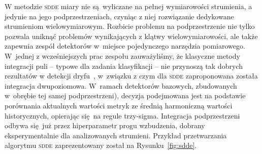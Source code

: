 W metodzie \textsc{sdde} miary nie są wyliczane na pełnej wymiarowości strumienia, a jedynie na jego podprzestrzeniach, czyniąc z niej rozwiązanie dedykowane strumieniom wielowymiarowym. Rozbicie problemu na podprzestrzenie nie tylko pozwala uniknąć problemów wynikających z klątwy wielowymiarowości, ale także zapewnia zespół detektorów w~miejsce pojedynczego narzędzia pomiarowego. W~jednej z wcześniejszych prac zespołu zauważyliśmy, że klasyczne metody integracji puli -- typowe dla zadania klasyfikacji -- nie przynoszą tak dobrych rezultatów w detekcji dryfu~, w~związku z czym dla \textsc{sdde} zaproponowana została integracja dwupoziomowa. W~ramach detektorów bazowych, zbudowanych w~obrębie tej samej podprzestrzeni), decyzja podejmowana jest na podstawie porównania aktualnych wartości metryk ze średnią harmoniczną wartości historycznych, opierając się na regule trzy-sigma. Integracja podprzestrzeni odbywa się już przez hiperparametr progu wzbudzenia, dobrany eksperymentalnie dla analizowanych strumieni. Przykład przetwarzania algorytmu \textsc{sdde} zaprezentowany został na Rysunku~\ref{fig:sdde}.

